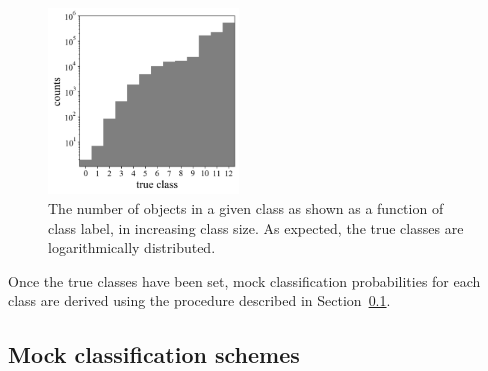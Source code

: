 \begin{figure}
	\begin{center}
    \includegraphics[width=0.45\textwidth]{./fig/complete_counts.png}
		\caption{The number of objects in a given class as shown as a function of class label, in increasing class size. As expected, the true classes are logarithmically distributed.}
		\label{fig:classdist}
	\end{center}
\end{figure}

Once the true classes have been set, mock classification probabilities for each class are derived using the procedure described in Section~\ref{sec:mockdata}.

\subsection{Mock classification schemes}
\label{sec:mockdata}

